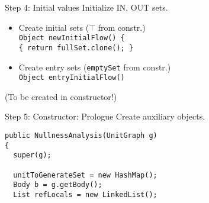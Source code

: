 
\begin{slide}{Step 4: Initial values}
\vspace*{-0.1in}
Initialize IN, OUT sets.
\begin{itemize}

\item Create initial sets ($\top$ from constr.)\\
{\tt Object newInitialFlow() \{\\
\qquad \tt \{ return fullSet.clone(); \} }

\vspace*{0.1in}

\item Create entry sets ({\tt emptySet} from constr.)\\
{\tt Object entryInitialFlow()}\\
\end{itemize}

(To be created in constructor!)
\end{slide}

\begin{slide}{Step 5: Constructor: Prologue}
\vspace*{-0.1in}
Create auxiliary objects.
\vspace*{0.05in}
\begin{verbatim}
public NullnessAnalysis(UnitGraph g)
{
  super(g);

  unitToGenerateSet = new HashMap();
  Body b = g.getBody();
  List refLocals = new LinkedList();
\end{verbatim}
\end{slide}

